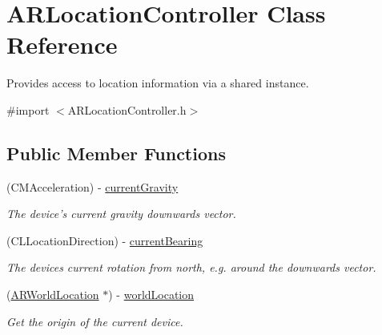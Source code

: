 \hypertarget{interface_a_r_location_controller}{
\section{\-A\-R\-Location\-Controller \-Class \-Reference}
\label{interface_a_r_location_controller}
}


\-Provides access to location information via a shared instance.  




{\ttfamily \#import $<$\-A\-R\-Location\-Controller.\-h$>$}

\subsection*{\-Public \-Member \-Functions}
\begin{DoxyCompactItemize}
\item 
\hypertarget{interface_a_r_location_controller_aece737bf9997135b189c20d21e987afc}{
(\-C\-M\-Acceleration) -\/ \hyperlink{interface_a_r_location_controller_aece737bf9997135b189c20d21e987afc}{current\-Gravity}}
\label{interface_a_r_location_controller_aece737bf9997135b189c20d21e987afc}

\begin{DoxyCompactList}\small\item\em \-The device's current gravity downwards vector. \end{DoxyCompactList}\item 
\hypertarget{interface_a_r_location_controller_af59323af0761354ffe3b3f7a8f2a04c7}{
(\-C\-L\-Location\-Direction) -\/ \hyperlink{interface_a_r_location_controller_af59323af0761354ffe3b3f7a8f2a04c7}{current\-Bearing}}
\label{interface_a_r_location_controller_af59323af0761354ffe3b3f7a8f2a04c7}

\begin{DoxyCompactList}\small\item\em \-The devices current rotation from north, e.\-g. around the downwards vector. \end{DoxyCompactList}\item 
\hypertarget{interface_a_r_location_controller_add343901133f310b9a56d66f89cf5a6a}{
(\hyperlink{interface_a_r_world_location}{\-A\-R\-World\-Location} $\ast$) -\/ \hyperlink{interface_a_r_location_controller_add343901133f310b9a56d66f89cf5a6a}{world\-Location}}
\label{interface_a_r_location_controller_add343901133f310b9a56d66f89cf5a6a}

\begin{DoxyCompactList}\small\item\em \-Get the origin of the current device. \end{DoxyCompactList}\end{DoxyCompactItemize}
